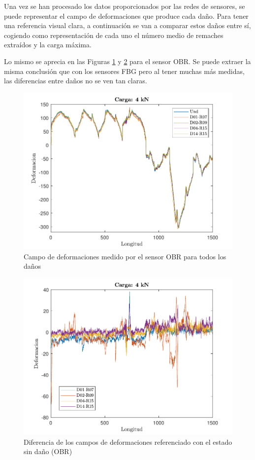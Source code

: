    
 
Una vez se han procesado los datos proporcionados por las redes de sensores, se puede representar el campo de deformaciones que produce cada daño. Para tener una referencia visual clara, a continuación se van a comparar estos daños entre sí, cogiendo como representación de cada uno el número medio de remaches extraídos y la carga máxima.


    

    
Lo mismo se aprecia en las Figuras \ref{OBRR_dam} y \ref{OBRR_dif} para el sensor OBR. Se puede extraer la misma conclusión que con los sensores FBG pero al tener muchas más medidas, las diferencias entre daños no se ven tan claras.

\begin{figure}[h!]
    \centering
    \includegraphics[width=125mm, angle=0]{3/Fotos/OBR_damages.pdf}
    \captionsetup{justification=centering,margin=1.25cm}
    \caption{Campo de deformaciones medido por el sensor OBR para todos los daños}
    \label{OBRR_dam}
\end{figure}
    
\begin{figure}[h!]
    \centering
    \includegraphics[width=125mm, angle=0]{3/Fotos/OBR_dif.pdf}
    \captionsetup{justification=centering,margin=1.25cm}
    \caption{Diferencia de los campos de deformaciones referenciado con el estado sin daño (OBR)}
    \label{OBRR_dif}
\end{figure}
    
